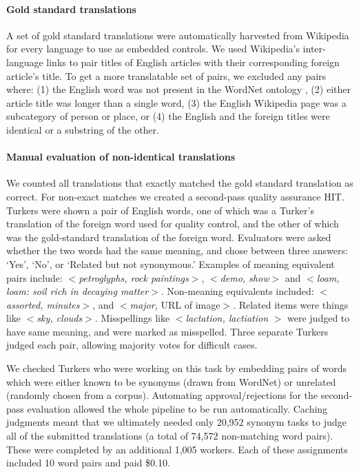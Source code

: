 \documentclass[11pt]{article}
\begin{document}
\paragraph{Gold standard translations} 
A set of gold standard translations were automatically harvested from Wikipedia  for every language to use as embedded controls. We used Wikipedia's inter-language links to pair titles of English articles with their corresponding foreign article's title.  To get a more translatable set of pairs, we excluded any pairs where: (1) the English word was not present in the WordNet ontology  \cite{miller1995wordnet}, (2) either article title was longer than a single word, (3) the English Wikipedia page was a subcategory of person or place, or (4) the English and the foreign titles were identical or a substring of the other.

\paragraph{Manual evaluation of non-identical translations}
We counted all translations that exactly matched the gold standard translation as correct.  For non-exact matches we created a second-pass quality assurance HIT.  
Turkers were shown a pair of English words, one of which was a Turker's translation of the foreign word used for quality control, and the other of which was the gold-standard translation of the foreign word. Evaluators were asked whether the two words had the same meaning, and chose between three answers: `Yes', `No', or `Related but not synonymous.'  Examples of meaning equivalent pairs include: $<${\it petroglyphs, rock paintings}$>$, $<${\it demo, show}$>$ and  $<${\it loam, loam: soil rich in decaying matter}$>$.  Non-meaning equivalents included: $<${\it assorted, minutes}$>$, and $<${\it major,} URL of image$>$.  Related items were things like $<${\it sky, clouds}$>$. Misspellings like $<${\it lactation, lactiation} $>$ were judged to have same meaning, and were marked as misspelled.   Three separate Turkers judged each pair, allowing majority votes for difficult cases. 


We checked Turkers who were working on this task by embedding pairs of words which were either known to be synonyms (drawn from WordNet) or  unrelated (randomly chosen from a corpus). 
Automating approval/rejections for the second-pass evaluation allowed the whole pipeline to be run automatically.  Caching judgments meant that we ultimately needed only 
20,952 synonym tasks to judge all of the submitted translations (a total of  74,572 non-matching word pairs).  These were completed by an additional 1,005 workers.  Each of these assignments included 10 word pairs and paid \$0.10.
\end{document}
